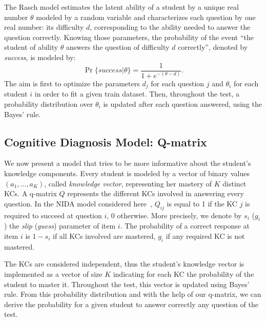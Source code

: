 \documentclass{edm_template}
\begin{document}
The Rasch model estimates the latent ability of a student by a unique real number $\theta$ modeled by a random variable and characterizes each question by one real number: its difficulty $d$, corresponding to the ability needed to answer the question correctly. Knowing those parameters, the probability of the event ``the student of ability $\theta$ answers the question of difficulty $d$ correctly'', denoted by \emph{success}, is modeled by:
\[ \Pr\{success|\theta\} = \frac1{1+e^{-(\theta - d)}}. \]
The aim is first to optimize the parameters $d_j$ for each question $j$ and $\theta_i$ for each student $i$ in order to fit a given train dataset. Then, throughout the test, a probability distribution over $\theta_i$ is updated after each question answered, using the Bayes' rule.

\subsection{Cognitive Diagnosis Model: Q-matrix}

We now present a model that tries to be more informative about the student's knowledge components. Every student is modeled by a vector of binary values $(a_1, \ldots, a_K)$, called \emph{knowledge vector}, representing her mastery of $K$ distinct KCs. A q-matrix $Q$ \cite{Tatsuoka1983} represents the different KCs involved in answering every question. In the NIDA model considered here~\cite{Desmarais2012}, $Q_{ij}$ is equal to 1 if the KC $j$ is required to succeed at question $i$, 0 otherwise. More precisely, we denote by $s_i$ ($g_i$) the \emph{slip} (\emph{guess}) parameter of item $i$. The probability of a correct response at item $i$ is $1 - s_i$ if all KCs involved are mastered, $g_i$ if any required KC is not mastered.


The KCs are considered independent, thus the student's knowledge vector is implemented as a vector of size $K$ indicating for each KC the probability of the student to master it. Throughout the test, this vector is updated using Bayes' rule. From this probability distribution and with the help of our q-matrix, we can derive the probability for a given student to answer correctly any question of the test.
\end{document}
